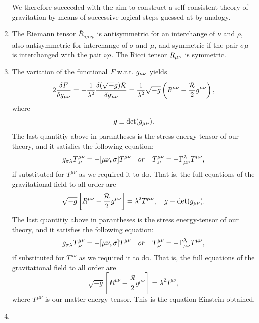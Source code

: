 \begin{enumerate}
We therefore succeeded with the aim to construct a self-consistent theory of gravitation by means of successive logical steps guessed at by analogy.
\item The Riemann tensor $\bar{R}_{\sigma \mu \nu \rho}$ is antisymmetric for an interchange of $\nu$ and $\rho$, also antisymmetric for interchange of $\sigma$ and $\mu$, and symmetric if the pair $\sigma \mu$ is interchanged with the pair $\nu \rho$. The Ricci tensor $R_{\mu \nu}$ is symmetric.
\item The variation of the functional $F$ w.r.t. $g_{\mu \nu}$ yields
\begin{equation}
	2 \frac{\delta F}{\delta g_{\mu \nu}} = - \frac{1}{\lambda^2} \frac{\delta (\sqrt-g) \mathcal{R}}{\delta g_{\mu \nu}} = \frac{1}{\lambda^2} \sqrt{-g} \left(R^{\mu \nu} - \frac{\mathcal{R}}{2} g^{\mu \nu} \right),
\end{equation}
where
\begin{equation}
	g \equiv \det(g_{\mu \nu}).
\end{equation}
The last quantitiy above in parantheses is the stress energy-tensor of our theory, and it satisfies the following equation:
\begin{equation}
	g_{\sigma \lambda} T^{\mu \nu}_{, \nu} = - [\mu \nu, \sigma] T^{\mu \nu} \quad or \quad T^{\mu \nu}_{,\nu} = - \Gamma^\lambda_{\mu \nu} T^{\mu \nu},
\end{equation}
if substituted for $T^{\mu \nu}$ as we required it to do. That is, the full equations of the gravitational field to all order are
\begin{equation}
	\sqrt{-g} \left[R^{\mu \nu} - \frac{\mathcal{R}}{2 } g^{\mu \nu} \right] = \lambda^2 T^{\mu \nu}, \quad
	g \equiv \det(g_{\mu \nu}).
\end{equation}
The last quantitiy above in parantheses is the stress energy-tensor of our theory, and it satisfies the following equation:
\begin{equation}
	g_{\sigma \lambda} T^{\mu \nu}_{, \nu} = - [\mu \nu, \sigma] T^{\mu \nu} \quad or \quad T^{\mu \nu}_{,\nu} = - \Gamma^\lambda_{\mu \nu} T^{\mu \nu},
\end{equation}
if substituted for $T^{\mu \nu}$ as we required it to do. That is, the full equations of the gravitational field to all order are
\begin{equation}
	\sqrt{-g} \left[R^{\mu \nu} - \frac{\mathcal{R}}{2 } g^{\mu \nu} \right] = \lambda^2 T^{\mu \nu},
\end{equation}
where $T^{\mu \nu}$ is our matter energy tensor. This is the equation Einstein obtained.

\item







\end{enumerate}








